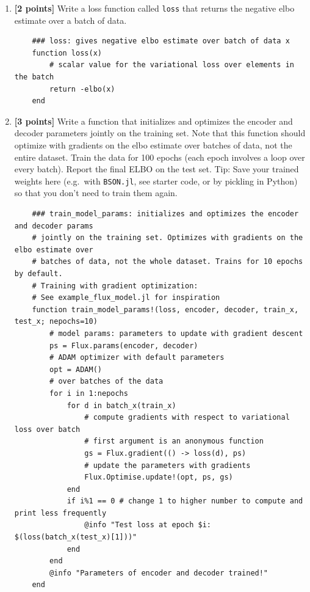 \documentclass{article}
\begin{document}
\begin{enumerate}[label=(\alph*)]
	\begin{lstlisting}
	### elbo: computing unbiased estimate of the elbo on a batch of images xs
	function elbo(x)
		# variational parameters from data
		q_mu, q_logsigma = encoder(x) 
		# sample from variational distribution
		z = sample_diag_gaussian(q_mu, q_logsigma) 
		# joint likelihood of z and x under model
		joint_ll = joint_log_density(x,z)
		# likelihood of z under variational distribution 
		log_q_z = log_q(q_mu, q_logsigma, z)
		# Scalar value, mean variational evidence lower bound over batch
		elbo_estimate = mean(joint_ll - log_q_z, dims=2)
		return elbo_estimate[1]
	end
	\end{lstlisting}	
	
	\item {\bf [2 points]} Write a loss function called \texttt{loss} that returns the negative elbo estimate over a batch of data.
	
	\begin{lstlisting}
	### loss: gives negative elbo estimate over batch of data x
	function loss(x)
		# scalar value for the variational loss over elements in the batch
		return -elbo(x)
	end
	\end{lstlisting}
	
	
	\item {\bf [3 points]} Write a function that initializes and optimizes the encoder and decoder parameters jointly on the training set. 
    Note that this function should optimize with gradients on the elbo estimate over batches of data, not the entire dataset.
    Train the data for 100 epochs (each epoch involves a loop over every batch).
    Report the final ELBO on the test set.
	Tip: Save your trained weights here (e.g.\ with \texttt{BSON.jl}, see starter code, or by pickling in Python) so that you don't need to train them again.
	
	\begin{lstlisting}
	### train_model_params: initializes and optimizes the encoder and decoder params
	# jointly on the training set. Optimizes with gradients on the elbo estimate over 
	# batches of data, not the whole dataset. Trains for 10 epochs by default.
	# Training with gradient optimization:
	# See example_flux_model.jl for inspiration
	function train_model_params!(loss, encoder, decoder, train_x, test_x; nepochs=10)
		# model params: parameters to update with gradient descent
		ps = Flux.params(encoder, decoder)
		# ADAM optimizer with default parameters
		opt = ADAM()
		# over batches of the data
		for i in 1:nepochs
			for d in batch_x(train_x)
				# compute gradients with respect to variational loss over batch 
				# first argument is an anonymous function
				gs = Flux.gradient(() -> loss(d), ps) 
				# update the parameters with gradients
				Flux.Optimise.update!(opt, ps, gs)
			end
			if i%1 == 0 # change 1 to higher number to compute and print less frequently
				@info "Test loss at epoch $i: $(loss(batch_x(test_x)[1]))"
			end
		end
		@info "Parameters of encoder and decoder trained!"
	end
	\end{lstlisting}
	
\end{enumerate}
\end{document}

